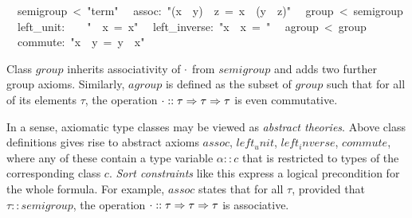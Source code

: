\begin{isabelle}
\isanewline
~~semigroup~<~{"}term{"}\isanewline
~~assoc:~{"}(x~{\isasymOtimes}~y)~{\isasymOtimes}~z~=~x~{\isasymOtimes}~(y~{\isasymOtimes}~z){"}\isanewline
\isanewline
{}\isanewline
~~group~<~semigroup\isanewline
~~left\_unit:~~~~{"}{\isasymunit}~{\isasymOtimes}~x~=~x{"}\isanewline
~~left\_inverse:~{"}x{\isasyminv}~{\isasymOtimes}~x~=~{\isasymunit}{"}\isanewline
\isanewline
{}\isanewline
~~agroup~<~group\isanewline
~~commute:~{"}x~{\isasymOtimes}~y~=~y~{\isasymOtimes}~x{"}%
\begin{isamarkuptext}%
\noindent Class $group$ inherits associativity of $\cdot$ from
 $semigroup$ and adds two further group axioms. Similarly, $agroup$
 is defined as the subset of $group$ such that for all of its elements
 $\tau$, the operation $\cdot :: \tau \Rightarrow \tau \Rightarrow \tau$ is even
 commutative.%
\end{isamarkuptext}%
%
%
\begin{isamarkuptext}%
In a sense, axiomatic type classes may be viewed as \emph{abstract
 theories}.  Above class definitions gives rise to abstract axioms
 $assoc$, $left_unit$, $left_inverse$, $commute$, where any of these
 contain a type variable $\alpha :: c$ that is restricted to types of
 the corresponding class $c$.  \emph{Sort constraints} like this
 express a logical precondition for the whole formula.  For example,
 $assoc$ states that for all $\tau$, provided that $\tau ::
 semigroup$, the operation $\cdot :: \tau \Rightarrow \tau \Rightarrow \tau$ is
 associative.


\end{isamarkuptext}
\end{isabelle}
